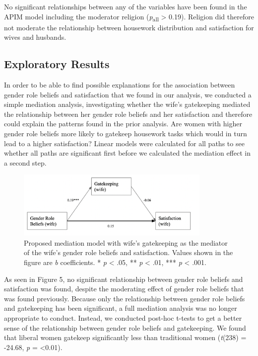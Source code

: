 \documentclass[
  man,floatsintext]{apa6}
\begin{document}
No significant relationships between any of the variables have been found in the APIM model including the moderator religion (\emph{p}\textsubscript{all} \textgreater{} 0.19). Religion did therefore not moderate the relationship between housework distribution and satisfaction for wives and husbands.

\hypertarget{exploratory-results}{%
\subsection{Exploratory Results}\label{exploratory-results}}

In order to be able to find possible explanations for the association between gender role beliefs and satisfaction that we found in our analysis, we conducted a simple mediation analysis, investigating whether the wife's gatekeeping mediated the relationship between her gender role beliefs and her satisfaction and therefore could explain the patterns found in the prior analysis. Are women with higher gender role beliefs more likely to gatekeep housework tasks which would in turn lead to a higher satisfaction?
Linear models were calculated for all paths to see whether all paths are significant first before we calculated the mediation effect in a second step.




\begin{figure}
\includegraphics[width=3.69in]{mediation} \caption{Proposed mediation model with wife's gatekeeping as the mediator of the wife's gender role beliefs and satisfaction. Values shown in the figure are \emph{b} coefficients.
* \emph{p} \textless{} .05, ** \emph{p} \textless{} .01, *** \emph{p} \textless{} .001.}\label{fig:unnamed-chunk-64}
\end{figure}

As seen in Figure 5, no significant relationship between gender role beliefs and satisfaction was found, despite the moderating effect of gender role beliefs that was found previously. Because only the relationship between gender role beliefs and gatekeeping has been significant, a full mediation analysis was no longer appropriate to conduct.
Instead, we conducted post-hoc t-tests to get a better sense of the relationship between gender role beliefs and gatekeeping. We found that liberal women gatekeep significantly less than traditional women (\emph{t}(238) = -24.68, \emph{p} = \textless0.01).
\end{document}
